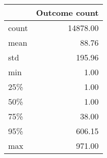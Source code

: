 \begin{tabular}{lr}
\toprule
{} &  Outcome count \\
\midrule
count &       14878.00 \\
mean  &          88.76 \\
std   &         195.96 \\
min   &           1.00 \\
25\%   &           1.00 \\
50\%   &           1.00 \\
75\%   &          38.00 \\
95\%   &         606.15 \\
max   &         971.00 \\
\bottomrule
\end{tabular}
